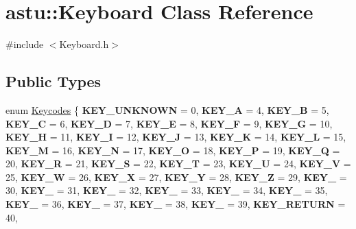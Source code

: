 \hypertarget{classastu_1_1Keyboard}{}\section{astu\+:\+:Keyboard Class Reference}
\label{classastu_1_1Keyboard}


{\ttfamily \#include $<$Keyboard.\+h$>$}

\subsection*{Public Types}
\begin{DoxyCompactItemize}
\item 
enum \hyperlink{classastu_1_1Keyboard_ac6ac295b9ef757f13ad8a70e3c38bc8c}{Keycodes} \{ \newline
{\bfseries K\+E\+Y\+\_\+\+U\+N\+K\+N\+O\+WN} = 0, 
{\bfseries K\+E\+Y\+\_\+A} = 4, 
{\bfseries K\+E\+Y\+\_\+B} = 5, 
{\bfseries K\+E\+Y\+\_\+C} = 6, 
\newline
{\bfseries K\+E\+Y\+\_\+D} = 7, 
{\bfseries K\+E\+Y\+\_\+E} = 8, 
{\bfseries K\+E\+Y\+\_\+F} = 9, 
{\bfseries K\+E\+Y\+\_\+G} = 10, 
\newline
{\bfseries K\+E\+Y\+\_\+H} = 11, 
{\bfseries K\+E\+Y\+\_\+I} = 12, 
{\bfseries K\+E\+Y\+\_\+J} = 13, 
{\bfseries K\+E\+Y\+\_\+K} = 14, 
\newline
{\bfseries K\+E\+Y\+\_\+L} = 15, 
{\bfseries K\+E\+Y\+\_\+M} = 16, 
{\bfseries K\+E\+Y\+\_\+N} = 17, 
{\bfseries K\+E\+Y\+\_\+O} = 18, 
\newline
{\bfseries K\+E\+Y\+\_\+P} = 19, 
{\bfseries K\+E\+Y\+\_\+Q} = 20, 
{\bfseries K\+E\+Y\+\_\+R} = 21, 
{\bfseries K\+E\+Y\+\_\+S} = 22, 
\newline
{\bfseries K\+E\+Y\+\_\+T} = 23, 
{\bfseries K\+E\+Y\+\_\+U} = 24, 
{\bfseries K\+E\+Y\+\_\+V} = 25, 
{\bfseries K\+E\+Y\+\_\+W} = 26, 
\newline
{\bfseries K\+E\+Y\+\_\+X} = 27, 
{\bfseries K\+E\+Y\+\_\+Y} = 28, 
{\bfseries K\+E\+Y\+\_\+Z} = 29, 
{\bfseries K\+E\+Y\+\_} = 30, 
\newline
{\bfseries K\+E\+Y\+\_} = 31, 
{\bfseries K\+E\+Y\+\_} = 32, 
{\bfseries K\+E\+Y\+\_} = 33, 
{\bfseries K\+E\+Y\+\_} = 34, 
\newline
{\bfseries K\+E\+Y\+\_} = 35, 
{\bfseries K\+E\+Y\+\_} = 36, 
{\bfseries K\+E\+Y\+\_} = 37, 
{\bfseries K\+E\+Y\+\_} = 38, 
\newline
{\bfseries K\+E\+Y\+\_} = 39, 
{\bfseries K\+E\+Y\+\_\+\+R\+E\+T\+U\+RN} = 40, 

\end{DoxyCompactItemize}
